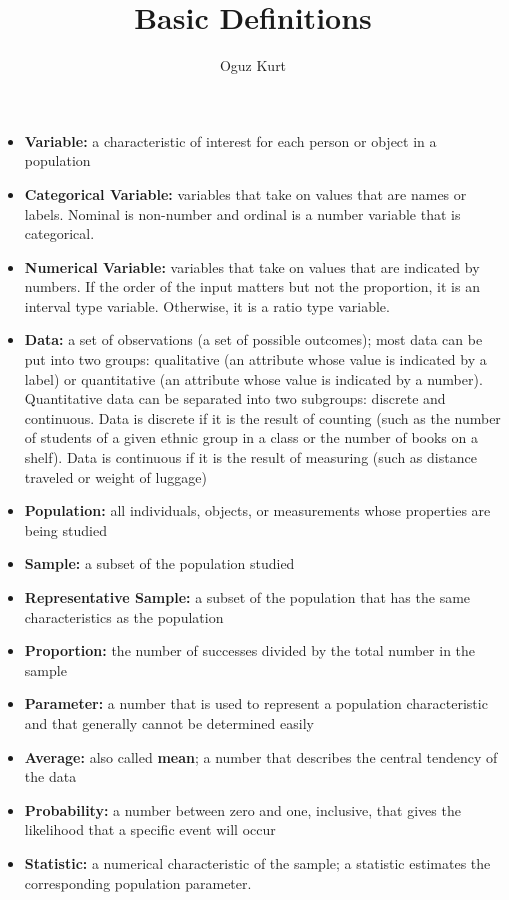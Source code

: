 \documentclass{ximera}
\title{Basic Definitions}
\author{Oguz Kurt}
\begin{document}
\maketitle

\begin{itemize}
\item \textbf{Variable:}
a characteristic of interest for each person or object in a population
\item \textbf{Categorical Variable:}
variables that take on values that are names or labels. Nominal is non-number and ordinal is a number variable that is categorical.
\item \textbf{Numerical Variable:}
variables that take on values that are indicated by numbers. If the order of the input matters but not the proportion, it is an interval type variable. Otherwise, it is a ratio type variable. 
\item \textbf{Data:}
a set of observations (a set of possible outcomes); most data can be put into two groups: qualitative (an attribute whose value is indicated by a label) or quantitative (an attribute whose value is indicated by a number). Quantitative data can be separated into two subgroups: discrete and continuous. Data is discrete if it is the result of counting (such as the number of students of a given ethnic group in a class or the number of books on a shelf). Data is continuous if it is the result of measuring (such as distance traveled or weight of luggage)
\item \textbf{Population:}
all individuals, objects, or measurements whose properties are being studied
\item \textbf{Sample:}
a subset of the population studied
\item \textbf{Representative Sample:}
a subset of the population that has the same characteristics as the population
\item \textbf{Proportion:}
the number of successes divided by the total number in the sample
\item \textbf{Parameter:}
a number that is used to represent a population characteristic and that generally cannot be determined easily
\item \textbf{Average:}
also called \textbf{mean}; a number that describes the central tendency of the data
\item \textbf{Probability:}
a number between zero and one, inclusive, that gives the likelihood that a specific event will occur
\item \textbf{Statistic:}
a numerical characteristic of the sample; a statistic estimates the corresponding population parameter.
\end{itemize}
\end{document}
